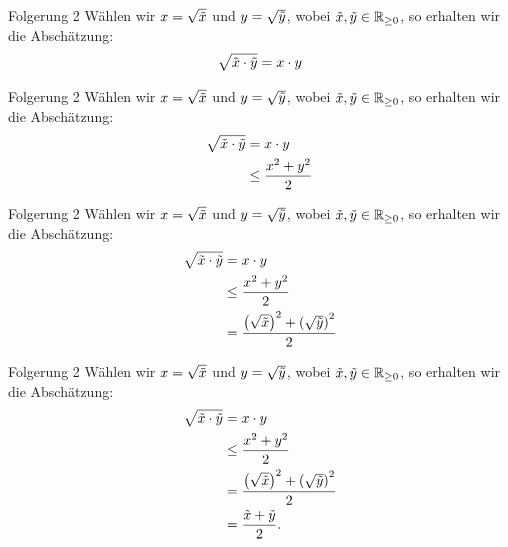 \documentclass[10pt]{beamer}
\def\bR{\mathbb{R}}
\begin{document}
\begin{frame}{Folgerung 2}
    Wählen wir \( x = \sqrt{\Tilde{x}} \) und \( y = \sqrt{\Tilde{y}} \), wobei \( \Tilde{x}, \Tilde{y} \in \bR_{\geq 0} \), so erhalten wir die Abschätzung:
    \begin{align*}
        \sqrt{\Tilde{x} \cdot \Tilde{y}}
        & = x \cdot y \\
    \end{align*}
\end{frame}



\begin{frame}{Folgerung 2}
    Wählen wir \( x = \sqrt{\Tilde{x}} \) und \( y = \sqrt{\Tilde{y}} \), wobei \( \Tilde{x}, \Tilde{y} \in \bR_{\geq 0} \), so erhalten wir die Abschätzung:
    \begin{align*}
        \sqrt{\Tilde{x} \cdot \Tilde{y}}
        & = x \cdot y \\
        & \leq \frac{x^{2} + y^{2}}{2} \\
    \end{align*}
\end{frame}



\begin{frame}{Folgerung 2}
    Wählen wir \( x = \sqrt{\Tilde{x}} \) und \( y = \sqrt{\Tilde{y}} \), wobei \( \Tilde{x}, \Tilde{y} \in \bR_{\geq 0} \), so erhalten wir die Abschätzung:
    \begin{align*}
        \sqrt{\Tilde{x} \cdot \Tilde{y}}
        & = x \cdot y \\
        & \leq \frac{x^{2} + y^{2}}{2} \\
        & = \frac{\left( \sqrt{\Tilde{x}} \right)^{2} + \left( \sqrt{\Tilde{y}} \right)^{2}}{2} \\
    \end{align*}
\end{frame}



\begin{frame}{Folgerung 2}
    Wählen wir \( x = \sqrt{\Tilde{x}} \) und \( y = \sqrt{\Tilde{y}} \), wobei \( \Tilde{x}, \Tilde{y} \in \bR_{\geq 0} \), so erhalten wir die Abschätzung:
    \begin{align*}
        \sqrt{\Tilde{x} \cdot \Tilde{y}}
        & = x \cdot y \\
        & \leq \frac{x^{2} + y^{2}}{2} \\
        & = \frac{\left( \sqrt{\Tilde{x}} \right)^{2} + \left( \sqrt{\Tilde{y}} \right)^{2}}{2} \\
        & = \frac{\Tilde{x} + \Tilde{y}}{2}.
    \end{align*}
\end{frame}
\end{document}
